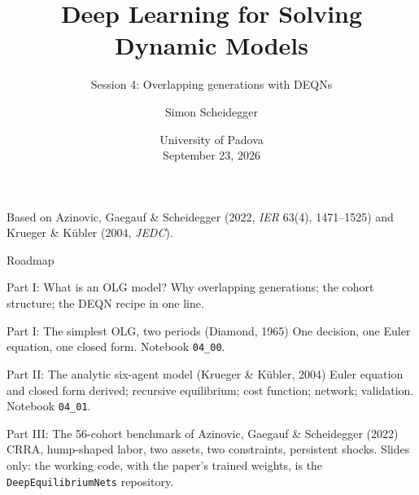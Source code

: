 \documentclass[aspectratio=169,11pt]{beamer}
\title[OLG -- Padova 2026]%
{Deep Learning for Solving Dynamic Models}
\subtitle{Session 4: Overlapping generations with DEQNs}
\author{Simon Scheidegger}
\institute[HEC Lausanne]{HEC, University of Lausanne}
\date{University of Padova\\September 23, 2026}
\begin{document}
{
\begin{frame}
\titlepage
\vspace{-0.4cm}
\begin{center}
{\footnotesize Based on Azinovic, Gaegauf \& Scheidegger (2022, \emph{IER} 63(4), 1471--1525) and Krueger \& K\"ubler (2004, \emph{JEDC}).}
\end{center}
\end{frame}
}

\begin{frame}{Roadmap}
\small
\begin{block}{Part I: What is an OLG model?}
Why overlapping generations; the cohort structure; the DEQN recipe in one line.
\end{block}
\begin{block}{Part I\textonehalf: The simplest OLG, two periods (Diamond, 1965)}
One decision, one Euler equation, one closed form. Notebook \texttt{04\_00}.
\end{block}
\begin{block}{Part II: The analytic six-agent model (Krueger \& K\"ubler, 2004)}
Euler equation and closed form derived; recursive equilibrium; cost function; network; validation. Notebook \texttt{04\_01}.
\end{block}
\begin{block}{Part III: The 56-cohort benchmark of Azinovic, Gaegauf \& Scheidegger (2022)}
CRRA, hump-shaped labor, two assets, two constraints, persistent shocks. Slides only: the working code,
with the paper's trained weights, is the \texttt{DeepEquilibriumNets} repository.
\end{block}
\end{frame}
\end{document}
